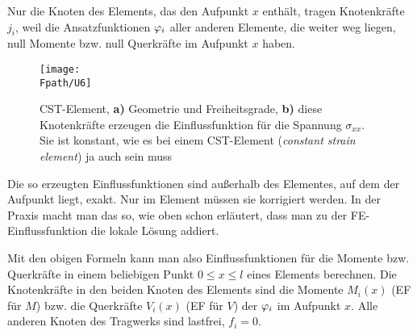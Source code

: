\begin{example}
Nur die Knoten des Elements, das den Aufpunkt $x$ enth\"{a}lt, tragen Knotenkr\"{a}fte $j_i$, weil die Ansatzfunktionen $\varphi_i$ aller anderen Elemente, die weiter weg liegen, null Momente bzw. null Querkr\"{a}fte im Aufpunkt $x$ haben.
\begin{figure}[tbp]
\centering
\if {} \sidecaption[t] \fi
\texttt{[image: \\Fpath/U6]}
\caption{CST-Element,  \textbf{ a)} Geometrie und Freiheitsgrade,  \textbf{ b)} diese Knotenkr\"{a}fte erzeugen die Einflussfunktion f\"{u}r die Spannung $\sigma_{xx}$. Sie ist konstant,  wie es bei einem CST-Element ({\em constant strain element\/})  ja auch sein muss}
\label{U6}
\end{figure}%

Die so erzeugten Einflussfunktionen sind au{\ss}erhalb des Elementes, auf dem der Aufpunkt liegt, exakt. Nur im Element m\"{u}ssen sie korrigiert werden. In der Praxis macht man das so, wie oben schon erl\"{a}utert, dass man zu der FE-Einflussfunktion die lokale L\"{o}sung addiert.

Mit den obigen Formeln kann man also Einflussfunktionen f\"{u}r die Momente bzw. Querkr\"{a}fte in einem beliebigen Punkt $0 \leq x \leq l$ eines Elements berechnen. Die Knotenkr\"{a}fte in den beiden Knoten des Elements sind die Momente $M_i(x)$ (EF f\"{u}r $M$) bzw. die Querkr\"{a}fte $V_i(x)$ (EF f\"{u}r $V$) der $\varphi_i$ im Aufpunkt $x$. Alle anderen Knoten des Tragwerks sind lastfrei, $f_i = 0$.
\end{example}


